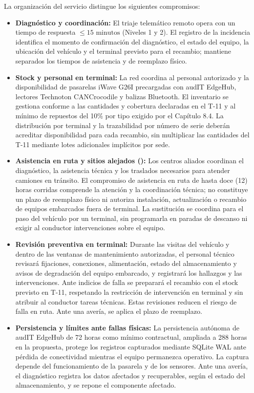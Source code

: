La organización del servicio distingue los siguientes compromisos:
\begin{itemize}
  \item \textbf{Diagnóstico y coordinación:} El triaje telemático remoto opera con un tiempo de respuesta $\le 15\text{ minutos}$ (Niveles 1 y 2). El registro de la incidencia identifica el momento de confirmación del diagnóstico, el estado del equipo, la ubicación del vehículo y el terminal previsto para el recambio; mantiene separados los tiempos de asistencia y de reemplazo físico.
  \item \textbf{Stock y personal en terminal:} La red coordina al personal autorizado y la disponibilidad de pasarelas iWave G26I precargadas con audIT EdgeHub, lectores Technoton CANCrocodile y balizas Bluetooth. El inventario se gestiona conforme a las cantidades y cobertura declaradas en el T-11 y al mínimo de repuestos del 10\% por tipo exigido por el Capítulo 8.4. La distribución por terminal y la trazabilidad por número de serie deberán acreditar disponibilidad para cada recambio, sin multiplicar las cantidades del T-11 mediante lotes adicionales implícitos por sede.
  \item \textbf{Asistencia en ruta y sitios alejados ():} Los centros aliados coordinan el diagnóstico, la asistencia técnica y los traslados necesarios para atender camiones en tránsito. El compromiso de asistencia en ruta de hasta doce (12) horas corridas comprende la atención y la coordinación técnica; no constituye un plazo de reemplazo físico ni autoriza instalación, actualización o recambio de equipos embarcados fuera de terminal. La sustitución se coordina para el paso del vehículo por un terminal, sin programarla en paradas de descanso ni exigir al conductor intervenciones sobre el equipo.
  \item \textbf{Revisión preventiva en terminal:} Durante las visitas del vehículo y dentro de las ventanas de mantenimiento autorizadas, el personal técnico revisará fijaciones, conexiones, alimentación, estado del almacenamiento y avisos de degradación del equipo embarcado, y registrará los hallazgos y las intervenciones. Ante indicios de falla se preparará el recambio con el stock previsto en T-11, respetando la restricción de intervención en terminal y sin atribuir al conductor tareas técnicas. Estas revisiones reducen el riesgo de falla en ruta. Ante una avería, se aplica el plazo de reemplazo.
  \item \textbf{Persistencia y límites ante fallas físicas:} La persistencia autónoma de audIT EdgeHub de 72 horas como mínimo contractual, ampliada a 288 horas en la propuesta, protege los registros capturados mediante SQLite WAL ante pérdida de conectividad mientras el equipo permanezca operativo. La captura depende del funcionamiento de la pasarela y de los sensores. Ante una avería, el diagnóstico registra los datos afectados y recuperables, según el estado del almacenamiento, y se repone el componente afectado.

\end{itemize}
